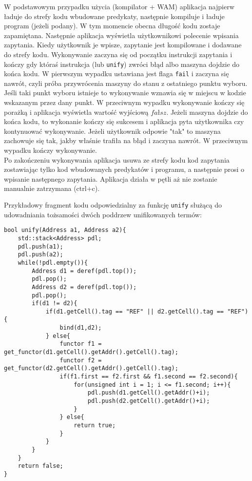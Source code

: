 W podstawowym przypadku użycia (kompilator + WAM) aplikacja najpierw ładuje do strefy kodu wbudowane predykaty, następnie kompiluje i ładuje program (jeżeli podany). W tym momencie obecna długość kodu zostaje zapamiętana. Następnie aplikacja wyświetla użytkownikowi polecenie wpisania zapytania. Kiedy użytkownik je wpisze, zapytanie jest kompilowane i dodawane do strefy kodu. Wykonywanie zaczyna się od początku instrukcji zapytania i kończy gdy któraś instrukcja (lub \texttt{unify}) zwróci błąd albo maszyna dojdzie do końca kodu. W pierwszym wypadku ustawiana jest flaga \texttt{fail} i zaczyna się nawrót, czyli próba przywrócenia maszyny do stanu z ostatniego punktu wyboru. Jeśli taki punkt wyboru istnieje to wykonywanie wznawia się w miejscu w kodzie wskazanym przez dany punkt. W przeciwnym wypadku wykonywanie kończy się porażką i aplikacja wyświetla wartość wyjściową $fałsz$. Jeżeli maszyna dojdzie do końca kodu, to wykonanie kończy się sukcesem i aplikacja pyta użytkownika czy kontynuować wykonywanie. Jeżeli użytkownik odpowie "tak" to maszyna zachowuje się tak, jakby właśnie trafiła na błąd i zaczyna nawrót. W przeciwnym wypadku kończy wykonywanie.\\
Po zakończeniu wykonywania aplikacja usuwa ze strefy kodu kod zapytania zostawiając tylko kod wbudowanych predykatów i programu, a następnie prosi o wpisanie następnego zapytania. Aplikacja działa w pętli aż nie zostanie manualnie zatrzymana (ctrl+c).\\

\begin{minipage}{\textwidth}
Przykładowy fragment kodu odpowiedzialny za funkcję \texttt{unify} służącą do udowadniania tożsamości dwóch poddrzew unifikowanych termów:\\
\begin{verbatim}
bool unify(Address a1, Address a2){
    std::stack<Address> pdl;
    pdl.push(a1);
    pdl.push(a2);
    while(!pdl.empty()){
        Address d1 = deref(pdl.top());
        pdl.pop();
        Address d2 = deref(pdl.top());
        pdl.pop();
        if(d1 != d2){
            if(d1.getCell().tag == "REF" || d2.getCell().tag == "REF"){
                bind(d1,d2);
            } else{
                functor f1 = get_functor(d1.getCell().getAddr().getCell().tag);
                functor f2 = get_functor(d2.getCell().getAddr().getCell().tag);
                if(f1.first == f2.first && f1.second == f2.second){
                    for(unsigned int i = 1; i <= f1.second; i++){
                        pdl.push(d1.getCell().getAddr()+i);
                        pdl.push(d2.getCell().getAddr()+i);
                    }
                } else{
                    return true;
                }
            }
        }
    }
    return false;
}
\end{verbatim}
\end{minipage}

